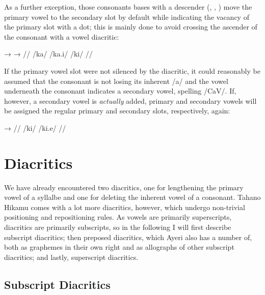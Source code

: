 As a further exception, those consonants bases with a descender (, 
, ) move the primary vowel to the secondary slot by default while 
indicating the vacancy of the primary slot with a dot; this is mainly done to 
avoid crossing the ascender of the consonant with a vowel diacritic:

\ex[lingstyle=thex]\begingl
	\gla {}	→		→	 //
	\glb /ka/	{}	/ka.i/		{}	/ki/ //
\endgl\xe

If the primary vowel slot were not silenced by the  diacritic, it 
could reasonably be assumed that the consonant is not losing its inherent /a/ 
and the vowel underneath the consonant indicates a secondary vowel, spelling 
/CaV/. If, however, a secondary vowel is \emph{actually} added, primary and 
secondary vowels will be assigned the regular primary and secondary slots, 
respectively, again:

\ex[lingstyle=thex]\begingl
	\gla {}	→	 //
	\glb /ki/	{}	/ki.e/ //
\endgl\xe


\section{Diacritics}

We have already encountered two diacritics, one for lengthening the 
primary vowel of a syllalbe and one for deleting the inherent vowel of a 
consonant. Tahano Hikamu comes with a lot more diacritics, however, which 
undergo non-trivial positioning and repositioning rules. As vowels are 
primarily superscripts, diacritics are primarily subscripts, so in the 
following I will first describe subscript diacritics; then preposed diacritics, 
which Ayeri also has a number of, both as graphemes in their own right and as 
allographs of other subscript diacritics; and lastly, superscript diacritics.

\subsection{Subscript Diacritics}

